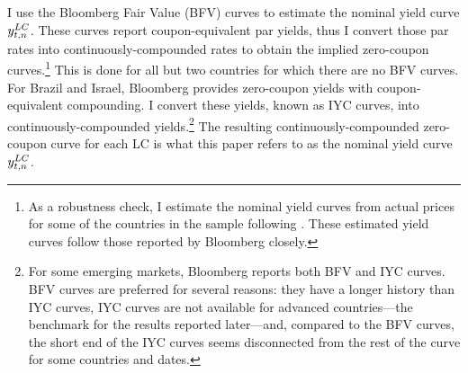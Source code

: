 {I use the Bloomberg Fair Value (BFV) curves to estimate the nominal yield curve $y_{t,n} ^{LC}$.
These curves report coupon-equivalent par yields, thus I convert those par rates into continuously-compounded rates
\citep*[see][]{GSW:2007} to obtain the implied zero-coupon curves.\footnote{As a robustness check, I estimate the nominal yield curves from actual prices for some of the countries in the sample following \cite{NelsonSiegel:1987}. These estimated yield curves follow those reported by Bloomberg closely.} This is done for all but two countries for which there are no BFV curves.
For Brazil and Israel, Bloomberg provides zero-coupon yields with coupon-equivalent compounding.
I convert these yields, known as IYC curves, into continuously-compounded yields.\footnote{ For some emerging markets, Bloomberg reports both BFV and IYC curves. BFV curves are preferred for several reasons: they have a longer history than IYC curves, IYC curves are not available for advanced countries---the benchmark for the results reported later---and, compared to the BFV curves, the short end of the IYC curves seems disconnected from the rest of the curve for some countries and dates.} 
The resulting continuously-compounded zero-coupon curve for each LC is what this paper refers to as the nominal yield curve \(y_{t,n} ^{LC}\).


}

